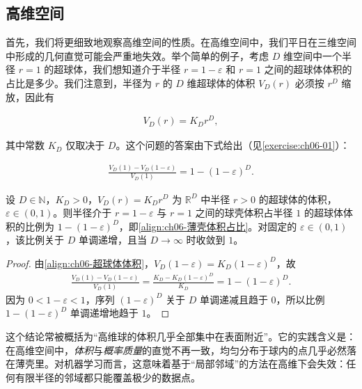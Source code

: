 \documentclass[../../main.tex]{subfiles}
\begin{document}
\subsection{高维空间}\label{subsection:ch06-高维空间}

首先，我们将更细致地观察高维空间的性质。在高维空间中，我们平日在三维空间中形成的几何直觉可能会严重地失效。举个简单的例子，考虑 $D$ 维空间中一个半径 $r=1$ 的超球体，我们想知道介于半径 $r=1-\varepsilon$ 和 $r=1$ 之间的超球体体积的占比是多少。我们注意到，半径为 $r$ 的 $D$ 维超球体的体积 $V_D(r)$ 必须按 $r^{D}$ 缩放，因此有

\begin{align}
V_D(r)=K_Dr^{D},
\label{align:ch06-超球体体积}
\end{align}

其中常数 $K_D$ 仅取决于 $D$。这个问题的答案由下式给出（见\cref{exercise:ch06-01}）：

\begin{align}
\frac{V_D(1)-V_D(1-\varepsilon)}{V_D(1)}=1-(1-\varepsilon)^{D}.
\label{align:ch06-薄壳体积占比}
\end{align}

\begin{proposition}[高维超球体的薄壳效应]\label{proposition:ch06-超球体薄壳}
设 $D\in\mathbb{N}$，$K_{D}>0$，$V_{D}(r)=K_{D}r^{D}$ 为 $\mathbb{R}^{D}$ 中半径 $r>0$ 的超球体的体积，$\varepsilon\in(0,1)$。则半径介于 $r=1-\varepsilon$ 与 $r=1$ 之间的球壳体积占半径 $1$ 的超球体体积的比例为 $1-(1-\varepsilon)^{D}$，即\eqref{align:ch06-薄壳体积占比}。对固定的 $\varepsilon\in(0,1)$，该比例关于 $D$ 单调递增，且当 $D\to\infty$ 时收敛到 $1$。
\end{proposition}

\begin{proof}
由\eqref{align:ch06-超球体体积}，$V_D(1-\varepsilon)=K_D(1-\varepsilon)^{D}$，故
\begin{align}
\frac{V_D(1)-V_D(1-\varepsilon)}{V_D(1)}
=\frac{K_D-K_D(1-\varepsilon)^{D}}{K_D}=1-(1-\varepsilon)^{D}.
\end{align}
因为 $0<1-\varepsilon<1$，序列 $(1-\varepsilon)^{D}$ 关于 $D$ 单调递减且趋于 $0$，所以比例 $1-(1-\varepsilon)^{D}$ 单调递增地趋于 $1$。
\end{proof}

\begin{remark}这个结论常被概括为“高维球的体积几乎全部集中在表面附近”。它的实践含义是：在高维空间中，\emph{体积}与\emph{概率质量}的直觉不再一致，均匀分布于球内的点几乎必然落在薄壳里。对机器学习而言，这意味着基于“局部邻域”的方法在高维下会失效：任何有限半径的邻域都只能覆盖极少的数据点。
\end{remark}
\end{document}

